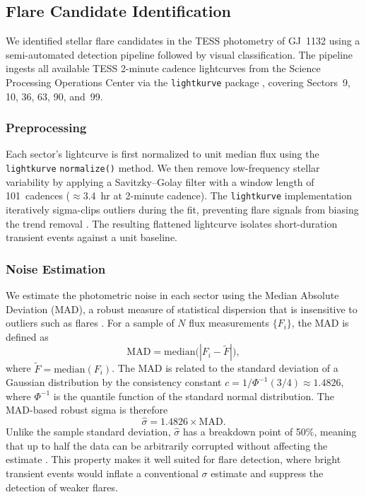 \subsection{Flare Candidate Identification}\label{sec:flare_detection}

We identified stellar flare candidates in the TESS photometry of
GJ~1132 using a semi-automated detection pipeline followed by visual
classification.  The pipeline ingests all available TESS 2-minute
cadence lightcurves from the Science Processing Operations Center
\citep[SPOC;][]{Jenkins2016} via the \texttt{lightkurve} package
\citep{Lightkurve2018}, covering Sectors~9, 10, 36, 63, 90, and~99.

\subsubsection{Preprocessing}

Each sector's lightcurve is first normalized to unit median flux using
the \texttt{lightkurve} \texttt{normalize()} method.  We then remove
low-frequency stellar variability by applying a Savitzky--Golay filter
\citep{Savitzky1964} with a window length of 101~cadences
($\approx$3.4~hr at 2-minute cadence).  The \texttt{lightkurve}
implementation iteratively sigma-clips outliers during the fit,
preventing flare signals from biasing the trend removal
\citep{Lightkurve2018}.  The resulting flattened lightcurve isolates
short-duration transient events against a unit baseline.

\subsubsection{Noise Estimation}

We estimate the photometric noise in each sector using the Median
Absolute Deviation (MAD), a robust measure of statistical dispersion
that is insensitive to outliers such as flares
\citep{Rousseeuw1993}.  For a sample of $N$ flux measurements
$\{F_i\}$, the MAD is defined as
\begin{equation}\label{eq:mad}
  \mathrm{MAD} = \mathrm{median}\bigl(|F_i - \widetilde{F}|\bigr),
\end{equation}
where $\widetilde{F} = \mathrm{median}(F_i)$.  The MAD is related to
the standard deviation of a Gaussian distribution by the consistency
constant $c = 1/\Phi^{-1}(3/4) \approx 1.4826$, where $\Phi^{-1}$ is
the quantile function of the standard normal distribution.  The
MAD-based robust sigma is therefore
\begin{equation}\label{eq:robust_sigma}
  \hat{\sigma} = 1.4826 \times \mathrm{MAD}.
\end{equation}
Unlike the sample standard deviation, $\hat{\sigma}$ has a breakdown
point of 50\%, meaning that up to half the data can be arbitrarily
corrupted without affecting the estimate \citep{Rousseeuw1993}.  This
property makes it well suited for flare detection, where bright
transient events would inflate a conventional $\sigma$ estimate and
suppress the detection of weaker flares.

